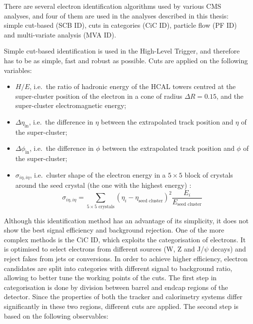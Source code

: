 There are several electron identification algorithms used by various CMS analyses, and four of them are used in the
analyses described in this thesis: simple cut-based (SCB ID), cuts in categories (CiC ID), particle flow (PF ID) and
multi-variate analysis (MVA ID).

Simple cut-based identification is used in the High-Level Trigger, and therefore has to be as simple, fast and
robust as possible. Cuts are applied on the following variables:

\begin{itemize}
  \item $H/E$, i.e.\ the ratio of hadronic energy of the HCAL towers centred at the super-cluster position of the
  electron in a cone of radius $\Delta R = 0.15$, and the super-cluster electromagnetic energy;
  \item $\Delta\eta_{\text{in}}$, i.e.\ the difference in $\eta$ between the extrapolated track position and $\eta$ of
  the super-cluster;
  \item $\Delta\phi_{\text{in}}$, i.e.\ the difference in $\phi$ between the extrapolated track position and $\phi$ of
  the super-cluster;
  \item $\sigma_{i\eta, i\eta}$, i.e.\ cluster shape of the electron energy in a $5\times5$ block of crystals around the
  seed crystal (the one with the highest energy) \cite{electron_reconstruction}:
  \begin{equation}
  \label{eq:cluster_shape}
    \sigma_{i\eta, i\eta} = \sum_{5\times5 \text{ crystals}} \left(\eta_i - \eta_\text{seed cluster}\right)^2
    \frac{E_i}{E_{\text{seed cluster}}}
  \end{equation}
\end{itemize}

Although this identification method has an advantage of its simplicity, it does not show the best signal efficiency and
background rejection. One of the more complex methods is the CiC ID, which exploits the categorisation of electrons. It
is optimised to select electrons from different sources (W, Z and J/$\psi$ decays) and reject fakes from jets or
conversions. In order to achieve higher efficiency, electron candidates are split into categories with different signal
to background ratio, allowing to better tune the working points of the cuts. The first step in categorisation is done by
division between barrel and endcap regions of the detector. Since the properties of both the tracker and calorimetry
systems differ significantly in these two regions, different cuts are applied. The second step is based on the following
observables:


